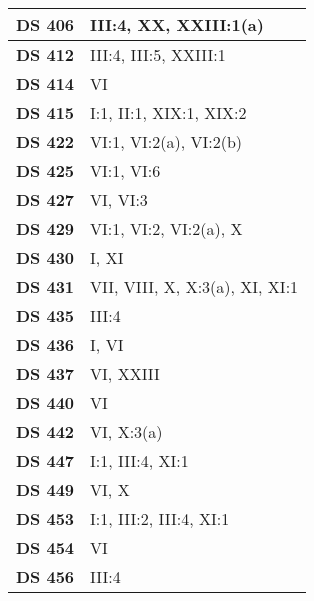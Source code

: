 \begin{xltabular}{\linewidth}{ l | X }
    \textbf {DS 406} & III:4, XX, XXIII:1(a) \\ \hline 
    
    \textbf {DS 412} & III:4, III:5, XXIII:1 \\ \hline 
    
    \textbf {DS 414} & VI \\ \hline 
    
    \textbf {DS 415} & I:1, II:1, XIX:1, XIX:2 \\ \hline 
    
    \textbf {DS 422} & VI:1, VI:2(a), VI:2(b) \\ \hline 
    
    \textbf {DS 425} & VI:1, VI:6 \\ \hline 
    
    \textbf {DS 427} & VI, VI:3 \\ \hline 
    
    \textbf {DS 429} & VI:1, VI:2, VI:2(a), X \\ \hline 
    
    \textbf {DS 430} & I, XI \\ \hline 
    
    \textbf {DS 431} & VII, VIII, X, X:3(a), XI, XI:1 \\ \hline 
    
    \textbf {DS 435} & III:4 \\ \hline 
    
    \textbf {DS 436} & I, VI \\ \hline 
    
    \textbf {DS 437} & VI, XXIII \\ \hline 
    
    \textbf {DS 440} & VI \\ \hline 
    
    \textbf {DS 442} & VI, X:3(a) \\ \hline 
    
    \textbf {DS 447} & I:1, III:4, XI:1 \\ \hline 
    
    \textbf {DS 449} & VI, X \\ \hline 
    
    \textbf {DS 453} & I:1, III:2, III:4, XI:1 \\ \hline 
    
    \textbf {DS 454} & VI \\ \hline 
    
    \textbf {DS 456} & III:4 \\ \hline 
    

\end{xltabular}
